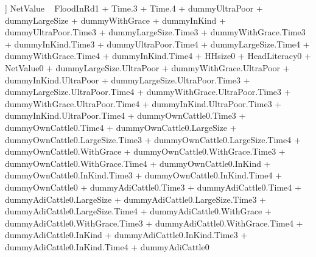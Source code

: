 \begin{Schunk}
\begin{Soutput}
[[5]]
NetValue ~ FloodInRd1 + Time.3 + Time.4 + dummyUltraPoor + dummyLargeSize + 
    dummyWithGrace + dummyInKind + dummyUltraPoor.Time3 + dummyLargeSize.Time3 + 
    dummyWithGrace.Time3 + dummyInKind.Time3 + dummyUltraPoor.Time4 + 
    dummyLargeSize.Time4 + dummyWithGrace.Time4 + dummyInKind.Time4 + 
    HHsize0 + HeadLiteracy0 + NetValue0 + dummyLargeSize.UltraPoor + 
    dummyWithGrace.UltraPoor + dummyInKind.UltraPoor + dummyLargeSize.UltraPoor.Time3 + 
    dummyLargeSize.UltraPoor.Time4 + dummyWithGrace.UltraPoor.Time3 + 
    dummyWithGrace.UltraPoor.Time4 + dummyInKind.UltraPoor.Time3 + 
    dummyInKind.UltraPoor.Time4 + dummyOwnCattle0.Time3 + dummyOwnCattle0.Time4 + 
    dummyOwnCattle0.LargeSize + dummyOwnCattle0.LargeSize.Time3 + 
    dummyOwnCattle0.LargeSize.Time4 + dummyOwnCattle0.WithGrace + 
    dummyOwnCattle0.WithGrace.Time3 + dummyOwnCattle0.WithGrace.Time4 + 
    dummyOwnCattle0.InKind + dummyOwnCattle0.InKind.Time3 + dummyOwnCattle0.InKind.Time4 + 
    dummyOwnCattle0 + dummyAdiCattle0.Time3 + dummyAdiCattle0.Time4 + 
    dummyAdiCattle0.LargeSize + dummyAdiCattle0.LargeSize.Time3 + 
    dummyAdiCattle0.LargeSize.Time4 + dummyAdiCattle0.WithGrace + 
    dummyAdiCattle0.WithGrace.Time3 + dummyAdiCattle0.WithGrace.Time4 + 
    dummyAdiCattle0.InKind + dummyAdiCattle0.InKind.Time3 + dummyAdiCattle0.InKind.Time4 + 
    dummyAdiCattle0
\end{Soutput}
\end{Schunk}
